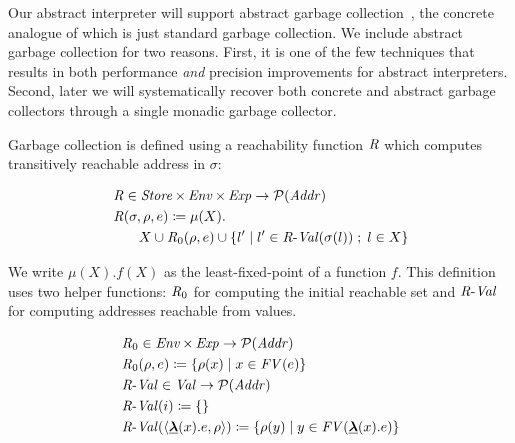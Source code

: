\par

Our abstract interpreter will support abstract garbage
collection~\cite{dvanhorn:Might:2006:GammaCFA}, the concrete analogue of
which is just standard garbage collection. We include abstract garbage
collection for two reasons. First, it is one of the few techniques that
results in both performance \emph{and} precision improvements for
abstract interpreters. Second, later we will systematically recover both
concrete and abstract garbage collectors through a single monadic
garbage collector.

\par

Garbage collection is defined using a reachability function $ \operatorname{\mathit{R}} $
which computes transitively reachable address in $ \sigma $:

\small\begin{align*}
&\hspace{0em}  \operatorname{\mathit{R}}   \in   \operatorname{\mathit{Store}}   \times   \operatorname{\mathit{Env}}   \times   \operatorname{\mathit{Exp}}   \rightarrow   \mathcal{P}  (\operatorname{\mathit{Addr}})  \\
&\hspace{0em}  \operatorname{\mathit{R}}(  \sigma , \rho ,e)  \coloneqq   \mu (X).  \\
&\hspace{2em} X  \cup   \operatorname{\mathit{R}} _0  ( \rho ,e)  \cup   \{ l'  \;|\;  l'  \in   \operatorname{\mathit{R-Val}}(  \sigma (l))  \;;\;  l  \in  X \} 
\end{align*}\normalsize

We write $ \mu (X). f(X)$ as the least-fixed-point of a function $f$.
This definition uses two helper functions: $ \operatorname{\mathit{R}} _0  $ for
computing the initial reachable set and $ \operatorname{\mathit{R-Val}} $ for computing
addresses reachable from values.

\small\begin{align*}
&\hspace{0em}  \operatorname{\mathit{R}} _0    \in   \operatorname{\mathit{Env}}   \times   \operatorname{\mathit{Exp}}   \rightarrow   \mathcal{P}  (\operatorname{\mathit{Addr}})  \\
&\hspace{0em}  \operatorname{\mathit{R}} _0  ( \rho ,e)  \coloneqq   \{  \rho (x)  \;|\;  x  \in   \operatorname{\mathit{FV}}( e) \}  \\
&\hspace{0em}  \operatorname{\mathit{R-Val}}   \in   \operatorname{\mathit{Val}}   \rightarrow   \mathcal{P}  (\operatorname{\mathit{Addr}})  \\
&\hspace{0em}  \operatorname{\mathit{R-Val}}( i)  \coloneqq   \{  \}  \\
&\hspace{0em}  \operatorname{\mathit{R-Val}}(  \langle  \underline{\operatorname{\mathtt{\boldsymbol{\mathbf{\lambda}}}}} (x).e, \rho  \rangle )  \coloneqq   \{  \rho (y)  \;|\;  y  \in   \operatorname{\mathit{FV}}(  \underline{\operatorname{\mathtt{\boldsymbol{\mathbf{\lambda}}}}} (x).e) \} 
\end{align*}\normalsize

